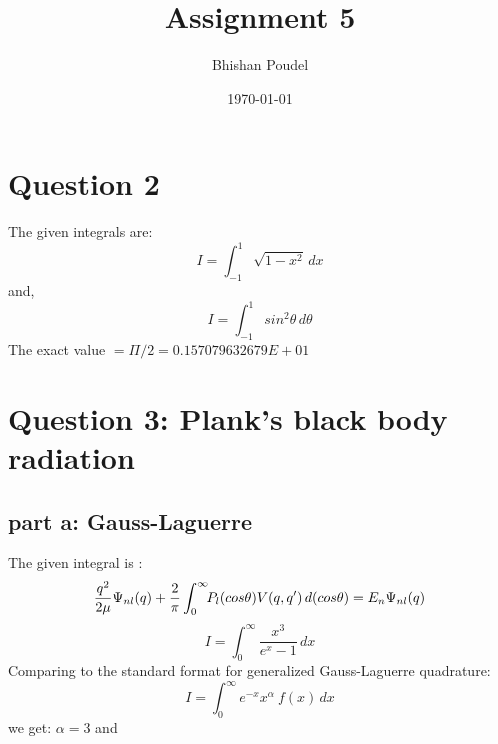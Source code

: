 \documentclass[11pt,a4paper,english]{article}
\title{Assignment 5}
\author{Bhishan Poudel}
\date{\today}
\begin{document}
\maketitle
\tableofcontents
\listoffigures
\clearpage

\section{Question 2}
The given integrals are:
\begin{displaymath}
I = \int_{-1}^{1} \!\! \sqrt{1-x^2}\,dx 
\end{displaymath}
and,\\

\begin{displaymath}
I = \int_{-1}^{1} \!\! {sin^2 \theta}\,d\theta
\end{displaymath}
The exact value $=\Pi/2 = 0.157079632679E+01$\\


\section{Question 3: Plank's black body radiation}

\subsection{part a: Gauss-Laguerre}

The given integral is :\\

	\begin{equation}
	  \frac{q^2}{2\mu} \Psi_{nl}(q) \\
	+ \frac{2}{\pi} \int_{0}^{\infty} \!\! P_{l}(cos\theta) V(q,q')\,d(cos\theta) \\
	 = E_n\Psi_{nl}(q)
	\end{equation}    
\begin{displaymath}
I = \int_0^\infty \!\! \frac{x^3}{e^{x} -1}\,dx
\end{displaymath}
Comparing to the standard format for generalized Gauss-Laguerre quadrature:\\

\begin{displaymath}
I = \int_0^\infty \!\! e^{-x}x^{\alpha}\ \!f(x)\,dx 
\end{displaymath}
we get:
$\alpha = 3 $ and \\
\end{document}
